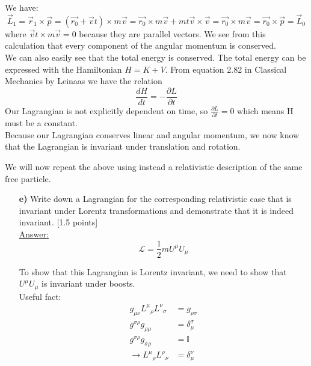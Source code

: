 \documentclass[11pt,a4paper]{report}
\newcommand{\pfrac}[2]{\frac{\partial #1}{\partial #2}}
\newcounter{excount}[chapter]
\newenvironment{exercise}[1][]{\addtocounter{excount}{1} \noindent {\bf Question
    \arabic{excount} \ \ #1}\hspace{2mm}}{\vspace{4mm}}
\begin{document}
\begin{exercise}{\bf A (boring) Lagrangian\\}
\begin{itemize}
We have:\\
\begin{equation}
\vec{L}_1 = \vec{r}_1 \times \vec{p} = (\vec{r_0} + \vec{v}t) \times m\vec{v} = \vec{r_0} \times m\vec{v} + mt\vec{v} \times \vec{v} = \vec{r_0} \times m\vec{v} = \vec{r_0} \times \vec{p} =\vec{L}_0
\end{equation}
where $\vec{v}t \times m\vec{v} = 0$ because they are parallel vectors. We see from this calculation that every component of the angular momentum is conserved.\\

We can also easily see that the total energy is conserved. The total energy can be expressed with the Hamiltonian $H = K + V$.
From equation 2.82 in Classical Mechanics  by Leinaas we have the relation
\begin{equation}
\frac{dH}{dt} = -\pfrac{L}{t}
\end{equation}
Our Lagrangian is not explicitly dependent on time, so $\pfrac{L}{t} = 0$ which means H must be a constant.\\

Because our Lagrangian conserves linear and angular momentum, we now know that the Lagrangian is invariant under translation and rotation.

\end{itemize}


We will now repeat the above using instead a relativistic description of the same free particle. 
\begin{itemize}
\item[\bf e)] Write down a Lagrangian for the corresponding relativistic case that is invariant under Lorentz transformations and demonstrate that it is indeed invariant. [1.5 points]\\



\underline{Answer:}\\
\begin{equation}
\mathcal{L} = \frac{1}{2}m U^{\mu}U_{\mu}
\end{equation}

To show that this Lagrangian is Lorentz invariant, we need to show that $U^{\mu}U_{\mu}$ is invariant under boosts.\\
Useful fact:
\begin{align*}
g_{\mu \nu}L^\mu{}_{\rho}L^\nu{}_{\sigma} &= g_{\rho \sigma}\\
g^{\sigma \rho} g_{\rho \mu} &= \delta_{\mu}^{\sigma}\\
g^{\sigma \rho} g_{\sigma \rho} &= \mathbb{I}\\
\rightarrow L^\mu{}_{\rho}L^\rho{}_{\nu} &= \delta_{\mu}^{\nu}
\end{align*}


\end{itemize}
\end{exercise}
\end{document}
